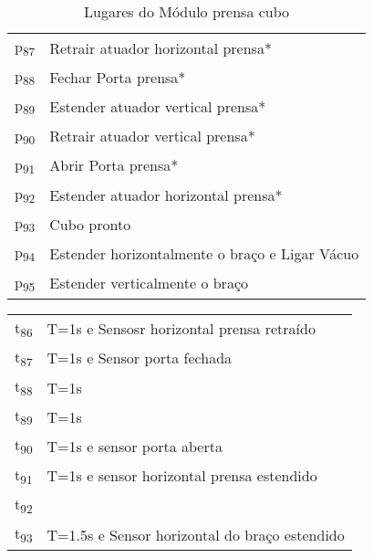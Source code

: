 \begin{table}[htbp]
\caption{Lugares do Módulo prensa cubo}
\centering
\begin{tabular}{ll}
p\textsubscript{87} & Retrair atuador horizontal prensa*\\
p\textsubscript{88} & Fechar Porta prensa*\\
p\textsubscript{89} & Estender atuador vertical prensa*\\
p\textsubscript{90} & Retrair atuador vertical prensa*\\
p\textsubscript{91} & Abrir Porta prensa*\\
p\textsubscript{92} & Estender atuador horizontal prensa*\\
p\textsubscript{93} & Cubo pronto\\
p\textsubscript{94} & Estender horizontalmente o braço e Ligar Vácuo\\
p\textsubscript{95} & Estender verticalmente o braço\\
\end{tabular}
\end{table}

\begin{center}
\begin{tabular}{ll}
t\textsubscript{86} & T=1s e Sensosr horizontal prensa retraído\\
t\textsubscript{87} & T=1s e Sensor porta fechada\\
t\textsubscript{88} & T=1s\\
t\textsubscript{89} & T=1s\\
t\textsubscript{90} & T=1s e sensor porta aberta\\
t\textsubscript{91} & T=1s e sensor horizontal prensa estendido\\
t\textsubscript{92} & \\
t\textsubscript{93} & T=1.5s e Sensor horizontal do braço estendido\\
\end{tabular}
\end{center}
